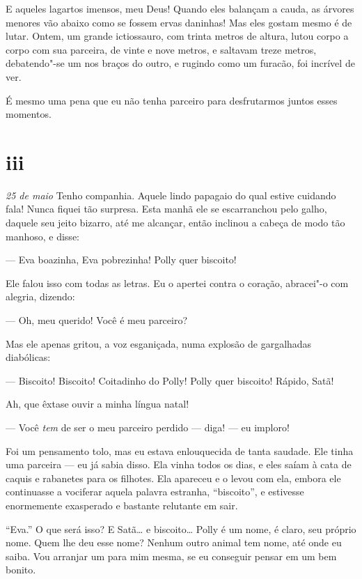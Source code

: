 E aqueles lagartos imensos, meu Deus! Quando eles balançam a cauda, as árvores menores vão abaixo como se fossem ervas daninhas!
Mas eles gostam mesmo é de lutar. Ontem, um grande ictiossauro, com trinta metros de altura, lutou corpo a corpo com sua parceira,
de vinte e nove metros, e saltavam treze metros, debatendo"-se um nos braços do outro, e rugindo como um furacão, foi incrível de ver.

É mesmo uma pena que eu não tenha parceiro para desfrutarmos juntos esses momentos.

\section*{iii}

\textit{25 de maio} Tenho companhia. Aquele lindo papagaio do qual estive cuidando fala! Nunca fiquei tão surpresa. Esta manhã
ele se escarranchou pelo galho, daquele seu jeito bizarro, até me alcançar, então inclinou a cabeça de modo tão manhoso,
e disse:

--- Eva boazinha, Eva pobrezinha! Polly quer biscoito!     

Ele falou isso com todas as letras. Eu o apertei contra o coração, abracei"-o com alegria, dizendo:

--- Oh, meu querido! Você é meu parceiro?

Mas ele apenas gritou, a voz esganiçada, numa explosão de gargalhadas diabólicas:

--- Biscoito! Biscoito! Coitadinho do Polly! Polly quer biscoito! Rápido, Satã!

Ah, que êxtase ouvir a minha língua natal!

--- Você \textit{tem} de ser o meu parceiro perdido --- diga! --- eu imploro!

Foi um pensamento tolo, mas eu estava enlouquecida de tanta saudade. Ele tinha uma parceira ---
eu já sabia disso. Ela vinha todos os dias, e eles saíam à cata de caquis e rabanetes para os filhotes. Ela apareceu e
o levou com ela, embora ele continuasse a vociferar aquela palavra estranha, ``biscoito'', e estivesse enormemente exasperado e
bastante relutante em sair.

``Eva.'' O que será isso? E Satã\ldots{} e biscoito\ldots{} Polly é um nome, é claro, seu próprio nome. Quem lhe deu esse nome? Nenhum outro animal
tem nome, até onde eu saiba. Vou arranjar um para mim mesma, se eu conseguir pensar em um bem bonito.

